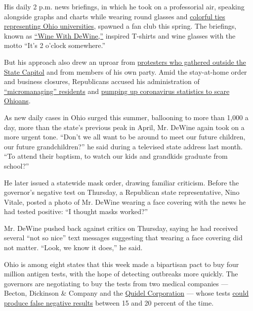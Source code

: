 His daily 2 p.m. news briefings, in which he took on a professorial air,
speaking alongside graphs and charts while wearing round glasses and
\href{https://twitter.com/GovMikeDeWine/status/1247586451623227394?s=20}{colorful
ties representing Ohio universities}, spawned a fan club this spring.
The briefings, known as
\href{https://www.cleveland.com/opinion/2020/05/wine-with-dewine-an-indispensable-refuge-in-our-day.html}{``Wine
With DeWine,''} inspired T-shirts and wine glasses with the motto ``It's
2 o'clock somewhere.''

But his approach also drew an uproar from
\href{https://www.dispatch.com/news/20200416/yoursquove-seen-photo-of-ohio-protesters-herersquos-story-behind-it}{protesters
who gathered outside the State Capitol} and from members of his own
party. Amid the stay-at-home order and business closures, Republicans
accused his administration of
\href{https://twitter.com/Rob_McColley/status/1256325645920907264?s=20}{``micromanaging''
residents} and
\href{https://www.daytondailynews.com/news/local/some-push-open-economy-dewine-says-plan-the-works-but-threat-not-over/uTxhHQuX3r4LJzjBVACyDK/}{pumping
up coronavirus statistics to scare Ohioans}.

As new daily cases in Ohio surged this summer, ballooning to more than
1,000 a day, more than the state's previous peak in April, Mr. DeWine
again took on a more urgent tone. ``Don't we all want to be around to
meet our future children, our future grandchildren?'' he said during a
televised state address last month. ``To attend their baptism, to watch
our kids and grandkids graduate from school?''

He later issued a statewide mask order, drawing familiar criticism.
Before the governor's negative test on Thursday, a Republican state
representative, Nino Vitale, posted a photo of Mr. DeWine wearing a face
covering with the news he had tested positive: ``I thought masks
worked?''

Mr. DeWine pushed back against critics on Thursday, saying he had
received several ``not so nice'' text messages suggesting that wearing a
face covering did not matter. ``Look, we know it does,'' he said.

Ohio is among eight states that this week made a bipartisan pact to buy
four million antigen tests, with the hope of detecting outbreaks more
quickly. The governors are negotiating to buy the tests from two medical
companies --- Becton, Dickinson \& Company and the
\href{https://www.nytimes3xbfgragh.onion/2020/05/09/health/antigen-testing-fda-coronavirus.html}{Quidel
Corporation} --- whose tests
\href{https://www.nytimes3xbfgragh.onion/2020/07/06/health/fast-coronavirus-tests.html}{could
produce false negative results} between 15 and 20 percent of the time.

